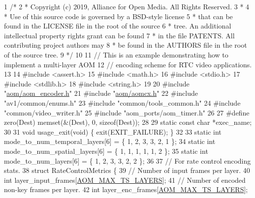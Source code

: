 \begin{DoxyCodeInclude}
1 \textcolor{comment}{/*}
2 \textcolor{comment}{ *  Copyright (c) 2019, Alliance for Open Media. All Rights Reserved.}
3 \textcolor{comment}{ *}
4 \textcolor{comment}{ *  Use of this source code is governed by a BSD-style license}
5 \textcolor{comment}{ *  that can be found in the LICENSE file in the root of the source}
6 \textcolor{comment}{ *  tree. An additional intellectual property rights grant can be found}
7 \textcolor{comment}{ *  in the file PATENTS.  All contributing project authors may}
8 \textcolor{comment}{ *  be found in the AUTHORS file in the root of the source tree.}
9 \textcolor{comment}{ */}
10 
11 \textcolor{comment}{//  This is an example demonstrating how to implement a multi-layer AOM}
12 \textcolor{comment}{//  encoding scheme for RTC video applications.}
13 
14 \textcolor{preprocessor}{#include <assert.h>}
15 \textcolor{preprocessor}{#include <math.h>}
16 \textcolor{preprocessor}{#include <stdio.h>}
17 \textcolor{preprocessor}{#include <stdlib.h>}
18 \textcolor{preprocessor}{#include <string.h>}
19 
20 \textcolor{preprocessor}{#include "\hyperlink{aom__encoder_8h}{aom/aom\_encoder.h}"}
21 \textcolor{preprocessor}{#include "\hyperlink{aomcx_8h}{aom/aomcx.h}"}
22 \textcolor{preprocessor}{#include "av1/common/enums.h"}
23 \textcolor{preprocessor}{#include "common/tools\_common.h"}
24 \textcolor{preprocessor}{#include "common/video\_writer.h"}
25 \textcolor{preprocessor}{#include "aom\_ports/aom\_timer.h"}
26 
27 \textcolor{preprocessor}{#define zero(Dest) memset(&(Dest), 0, sizeof(Dest));}
28 
29 \textcolor{keyword}{static} \textcolor{keyword}{const} \textcolor{keywordtype}{char} *exec\_name;
30 
31 \textcolor{keywordtype}{void} usage\_exit(\textcolor{keywordtype}{void}) \{ exit(EXIT\_FAILURE); \}
32 
33 \textcolor{keyword}{static} \textcolor{keywordtype}{int} mode\_to\_num\_temporal\_layers[6] = \{ 1, 2, 3, 3, 2, 1 \};
34 \textcolor{keyword}{static} \textcolor{keywordtype}{int} mode\_to\_num\_spatial\_layers[6] = \{ 1, 1, 1, 1, 1, 2 \};
35 \textcolor{keyword}{static} \textcolor{keywordtype}{int} mode\_to\_num\_layers[6] = \{ 1, 2, 3, 3, 2, 2 \};
36 
37 \textcolor{comment}{// For rate control encoding stats.}
38 \textcolor{keyword}{struct }RateControlMetrics \{
39   \textcolor{comment}{// Number of input frames per layer.}
40   \textcolor{keywordtype}{int} layer\_input\_frames[\hyperlink{group__aom__encoder_ga5ecd6f60f02c807e0de37df7b7278f4e}{AOM\_MAX\_TS\_LAYERS}];
41   \textcolor{comment}{// Number of encoded non-key frames per layer.}
42   \textcolor{keywordtype}{int} layer\_enc\_frames[\hyperlink{group__aom__encoder_ga5ecd6f60f02c807e0de37df7b7278f4e}{AOM\_MAX\_TS\_LAYERS}];

\end{DoxyCodeInclude}
